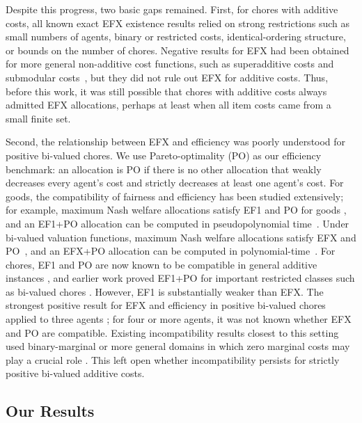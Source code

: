 \documentclass{article}
\theoremstyle{definition}
\begin{document}
Despite this progress, two basic gaps remained.  First, for chores with additive costs, all
known exact EFX existence results relied on strong restrictions such as small
numbers of agents, binary or restricted costs, identical-ordering structure, or
bounds on the number of chores.  Negative results for EFX had been obtained for
more general non-additive cost functions, such as superadditive costs
\citep{christoforidis2024pursuit} and submodular costs~\citep{christoforidis2026note}, but they did not rule out EFX for additive
costs.  Thus, before this work, it was still possible that chores with additive costs
always admitted EFX allocations, perhaps at least when all item costs came from a
small finite set.

Second, the relationship between EFX and efficiency was poorly understood for
positive bi-valued chores.  We use Pareto-optimality (PO) as our efficiency
benchmark: an allocation is PO if there is no other allocation that weakly
decreases every agent's cost and strictly decreases at least one agent's cost.
For goods, the compatibility of fairness and efficiency has been studied
extensively; for example, maximum Nash welfare allocations satisfy EF1 and PO for goods \citep{caragiannis2019unreasonable}, and an EF1+PO allocation can be computed in pseudopolynomial time~\citep{barman2018finding}.
Under bi-valued valuation functions, maximum Nash welfare allocations satisfy EFX and PO~\citep{amanatidis2021maximum}, and an EFX+PO allocation can be computed in polynomial-time~\citep{bu2024best}.
For chores, EF1 and PO are now known to be compatible in general additive instances
\citep{mahara2026existence}, and earlier work proved EF1+PO for important
restricted classes such as bi-valued chores
\citep{ebadian2022fairly,garg2022fair}.  However, EF1 is substantially weaker
than EFX.  The strongest positive result for EFX and efficiency in positive bi-valued chores applied to three agents \citep{garg2023new}; for four or more
agents, it was not known whether EFX and PO are compatible.  Existing incompatibility results closest to this setting used binary-marginal or more general domains in which zero marginal costs may play a crucial role
\citep{tao2025existence}.  
This left open whether incompatibility persists for strictly positive bi-valued additive costs.

\subsection{Our Results}
\label{subsec:our-results}
\end{document}
